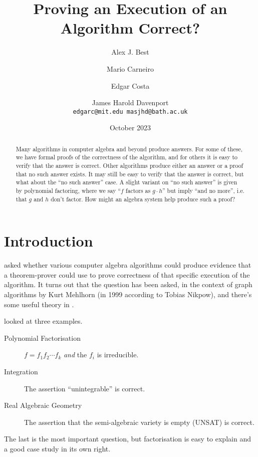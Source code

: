 \documentclass{llncs}
\title{Proving an Execution of an Algorithm Correct?}
\author{ Alex J. Best\and Mario Carneiro \and Edgar Costa \and James Harold Davenport\\%
\tt edgarc@mit.edu  masjhd@bath.ac.uk}
\institute{Imperial College \and ?? \and M.I.T. \and University of Bath, Bath BA2 7AY, UK}%
\date{October 2023}
\begin{document}
\maketitle
\begin{abstract}
Many algorithms in computer algebra and beyond produce answers. For some of these, we have formal proofs of the correctness of the algorithm, and for others it is easy to verify that the answer is correct. Other algorithms produce either an answer or a proof that no such answer exists. It may still be easy to verify that the answer is correct, but what about the ``no such answer'' case. A slight variant on ``no such answer'' is given by polynomial factoring, where we say ``$f$ factors as $g\cdot h$'' but imply ``and no more'', i.e. that $g$ and $h$ don't factor. How might an algebra system help produce such a proof?
\end{abstract}
\section{Introduction}
\cite{Davenport2023b} asked whether various computer algebra algorithms could produce evidence that a theorem-prover could use to prove correctness of that specific execution of the algorithm. It turns out that the question has been asked, in the context of graph algorithms by Kurt Mehlhorn \cite{Mehlhorn2011a} (in 1999 according to Tobias Nikpow), and there's some useful theory in \cite{McConnelletal2011a}.
\par
\cite{Davenport2023b} looked at three examples.
\begin{description}
\item[Polynomial Factorisation]$f=f_1f_2\cdots f_k$ \emph{and} the $f_i$ is irreducible.
\item[Integration]The assertion ``unintegrable'' is correct.
\item[Real Algebraic Geometry]The assertion that the semi-algebraic variety is empty (UNSAT) is correct.
\end{description}
The last is the most important question, but factorisation is easy to explain and a good case study in its own right.
\end{document}
